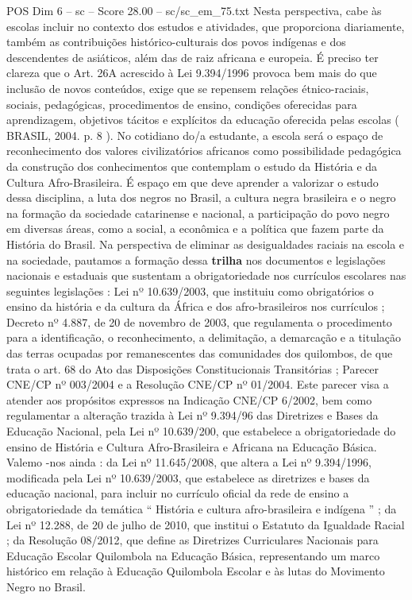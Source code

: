 \begin{textsample}{POS Dim 6 – sc – Score 28.00 – sc/sc\_em\_75.txt}
Nesta perspectiva, cabe às escolas incluir no contexto dos estudos e atividades, que proporciona diariamente, também as contribuições histórico-culturais dos povos indígenas e dos descendentes de asiáticos, além das de raiz africana e europeia.
É preciso ter clareza que o Art. 26A acrescido à Lei 9.394/1996 provoca bem mais do que inclusão de novos conteúdos, exige que se repensem relações étnico-raciais, sociais, pedagógicas, procedimentos de ensino, condições oferecidas para aprendizagem, objetivos tácitos e explícitos da educação oferecida pelas escolas ( BRASIL, 2004. p. 8 ).
No cotidiano do/a estudante, a escola será o espaço de reconhecimento dos valores civilizatórios africanos como possibilidade pedagógica da construção dos conhecimentos que contemplam o estudo da História e da Cultura Afro-Brasileira.
É espaço em que deve aprender a valorizar o estudo dessa disciplina, a luta dos negros no Brasil, a cultura negra brasileira e o negro na formação da sociedade catarinense e nacional, a participação do povo negro em diversas áreas, como a social, a econômica e a política que fazem parte da História do Brasil.
Na perspectiva de eliminar as desigualdades raciais na escola e na sociedade, pautamos a formação dessa \textbf{trilha} nos documentos e legislações nacionais e estaduais que sustentam a obrigatoriedade nos currículos escolares nas seguintes legislações : Lei nº 10.639/2003, que instituiu como obrigatórios o ensino da história e da cultura da África e dos afro-brasileiros nos currículos ; Decreto nº 4.887, de 20 de novembro de 2003, que regulamenta o procedimento para a identificação, o reconhecimento, a delimitação, a demarcação e a titulação das terras ocupadas por remanescentes das comunidades dos quilombos, de que trata o art. 68 do Ato das Disposições Constitucionais Transitórias ; Parecer CNE/CP nº 003/2004 e a Resolução CNE/CP nº 01/2004.
Este parecer visa a atender aos propósitos expressos na Indicação CNE/CP 6/2002, bem como regulamentar a alteração trazida à Lei nº 9.394/96 das Diretrizes e Bases da Educação Nacional, pela Lei nº 10.639/200, que estabelece a obrigatoriedade do ensino de História e Cultura Afro-Brasileira e Africana na Educação Básica.
Valemo -nos ainda : da Lei nº 11.645/2008, que altera a Lei nº 9.394/1996, modificada pela Lei nº 10.639/2003, que estabelece as diretrizes e bases da educação nacional, para incluir no currículo oficial da rede de ensino a obrigatoriedade da temática “ História e cultura afro-brasileira e indígena ” ; da Lei nº 12.288, de 20 de julho de 2010, que institui o Estatuto da Igualdade Racial ; da Resolução 08/2012, que define as Diretrizes Curriculares Nacionais para Educação Escolar Quilombola na Educação Básica, representando um marco histórico em relação à Educação Quilombola Escolar e às lutas do Movimento Negro no Brasil.

\end{textsample}
